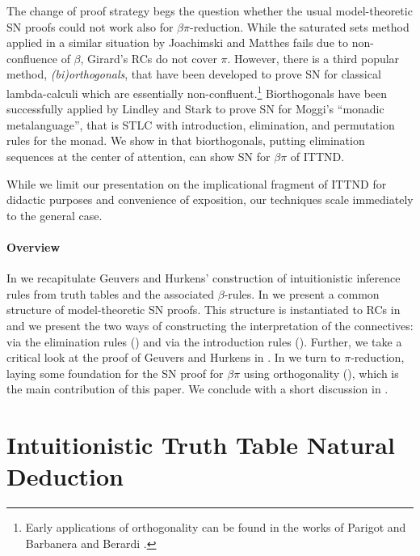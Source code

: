 \documentclass[a4paper,USenglish,cleveref, autoref, thm-restate]{lipics-v2019}
\begin{document}
The change of proof strategy begs the question whether the usual
model-theoretic SN proofs could not work also for
$\beta\pi$-reduction.  While the saturated sets method applied in
a similar situation by Joachimski and Matthes
\cite{joachimskiMatthes:rta00} fails due to non-confluence of $\beta$,
Girard's RCs do not cover $\pi$.  However, there is a third popular
method, \emph{(bi)orthogonals}, that have been developed to prove SN for classical lambda-calculi which are essentially non-confluent.\footnote{Early applications of orthogonality can be found in the works of Parigot \cite{parigot:jsl97,parigot:lamsym} and Barbanera and Berardi \cite{barbanera:lamsym}.}
Biorthogonals have been successfully applied by
Lindley and Stark \cite{lindleyStark:tlca05} to prove SN for Moggi's
``monadic metalanguage'', that is STLC with introduction, elimination,
and permutation rules for the monad.  We show in  that
biorthogonals, putting elimination sequences at the center of
attention, can show SN for $\beta\pi$ of ITTND.

While we limit our presentation on the implicational fragment of ITTND
for didactic purposes and convenience of exposition, our techniques
scale immediately to the general case.

\paragraph*{Overview}
%
In  we recapitulate Geuvers and Hurkens' construction of
intuitionistic inference rules from truth tables and the associated
$\beta$-rules.
%
In  we present a common structure of model-theoretic
SN proofs.
%
This structure is instantiated to RCs in  and we present
the two ways of constructing the interpretation of the connectives:
via the elimination rules () and via the
introduction rules ().  Further, we take a
critical look at the proof of Geuvers and Hurkens
\cite{geuversHurkens:types17} in .
%
In  we turn to $\pi$-reduction, laying some foundation
for the SN proof for $\beta\pi$ using orthogonality
(), which is the main contribution of this paper.
%
We conclude with a short discussion in .


\section{Intuitionistic Truth Table Natural Deduction}
\label{sec:nd}
\end{document}
